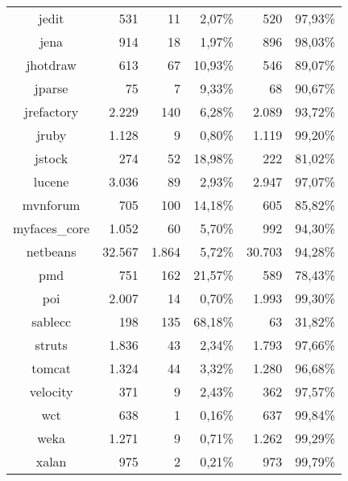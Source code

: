 \begin{table}
\begin{tabularx}{\textwidth}{c|r|r|r|r|r}
		jedit & 531 & 11 & 2,07\% & 520 & 97,93\% \\
		jena & 914 & 18 & 1,97\% & 896 & 98,03\% \\
		jhotdraw & 613 & 67 & 10,93\% & 546 & 89,07\% \\
		jparse & 75 & 7 & 9,33\% & 68 & 90,67\% \\
		jrefactory & 2.229 & 140 & 6,28\% & 2.089 & 93,72\% \\
		jruby & 1.128 & 9 & 0,80\% & 1.119 & 99,20\% \\
		jstock & 274 & 52 & 18,98\% & 222 & 81,02\% \\
		lucene & 3.036 & 89 & 2,93\% & 2.947 & 97,07\% \\
		mvnforum & 705 & 100 & 14,18\% & 605 & 85,82\% \\
		myfaces\_core & 1.052 & 60 & 5,70\% & 992 & 94,30\% \\
		netbeans & 32.567 & 1.864 & 5,72\% & 30.703 & 94,28\% \\
		pmd & 751 & 162 & 21,57\% & 589 & 78,43\% \\
		poi & 2.007 & 14 & 0,70\% & 1.993 & 99,30\% \\
		sablecc & 198 & 135 & 68,18\% & 63 & 31,82\% \\
		struts & 1.836 & 43 & 2,34\% & 1.793 & 97,66\% \\
		tomcat & 1.324 & 44 & 3,32\% & 1.280 & 96,68\% \\
		velocity & 371 & 9 & 2,43\% & 362 & 97,57\% \\
		wct & 638 & 1 & 0,16\% & 637 & 99,84\% \\
		weka & 1.271 & 9 & 0,71\% & 1.262 & 99,29\% \\
		xalan & 975 & 2 & 0,21\% & 973 & 99,79\% \\
	\end{tabularx}
\end{table}
\setlength{\extrarowheight}{0em}